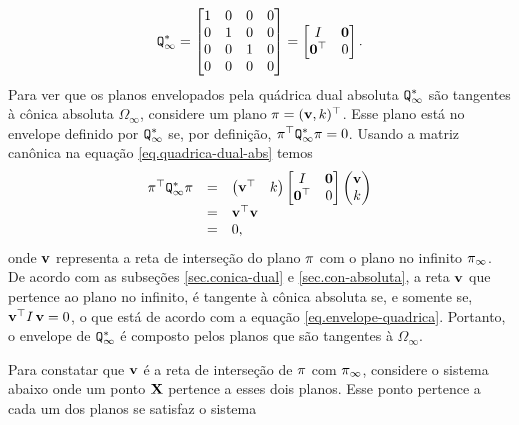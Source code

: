 \begin{equation}\label{eq.quadrica-dual-abs}
{\tt Q}^*_\infty=
\begin{bmatrix}
1&0&0&0\\
0&1&0&0\\
0&0&1&0\\
0&0&0&0
\end{bmatrix}=
\begin{bmatrix}
I&{\bf 0}\\
{\bf 0}^\top&0
\end{bmatrix}.
\end{equation}
Para ver que os planos envelopados pela quádrica dual absoluta ${\tt Q}^*_\infty$ são tangentes à cônica absoluta $\Omega_\infty$, considere um plano $\pi=({\bf v}, k)^\top$. Esse plano está no envelope definido por ${\tt Q}^*_\infty$ se, por definição, $\pi^\top {\tt Q}^*_\infty\pi=0$. Usando a matriz canônica na equação \ref{eq.quadrica-dual-abs} temos
\begin{equation}\label{eq.envelope-quadrica}
\begin{array}{rcl}
\pi^\top {\tt Q}^*_\infty\pi&=&
\begin{pmatrix}
{\bf v}^\top&k
\end{pmatrix}
\begin{bmatrix}
I&{\bf 0}\\
{\bf 0}^\top&0
\end{bmatrix}
\begin{pmatrix}
{\bf v}\\
k
\end{pmatrix}\\
&=&{\bf v}^\top {\bf v}\\
&=&0,
\end{array}
\end{equation}
onde ${\bf v}$ representa a reta de interseção do plano $\pi$ com o plano no infinito $\pi_\infty$. De acordo com as subseções \ref{sec.conica-dual} e \ref{sec.con-absoluta}, a reta ${\bf v}$ que pertence ao plano no infinito, é tangente à cônica absoluta se, e somente se, ${\bf v}^\top I\,{\bf v}=0$, o que está de acordo com a equação \ref{eq.envelope-quadrica}. Portanto, o envelope de ${\tt Q}^*_\infty$ é composto pelos planos que são tangentes à $\Omega_\infty$. 

Para constatar que ${\bf v}$ é a reta de interseção de $\pi$ com $\pi_\infty$, considere o sistema abaixo onde um ponto $\mathbf{X}$ pertence a esses dois planos. Esse ponto pertence a cada um dos planos se satisfaz o sistema

